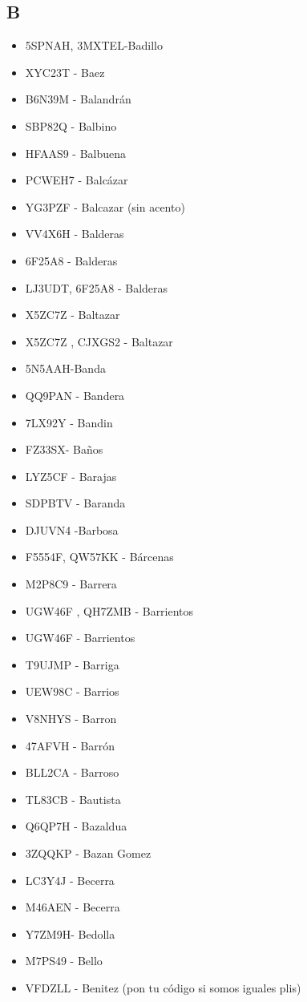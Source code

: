 \subsection*{B}
\begin{itemize}[leftmargin=*,nosep]
\item 5SPNAH, 3MXTEL-Badillo
\item XYC23T - Baez
\item B6N39M - Balandrán
\item SBP82Q  -  Balbino
\item HFAAS9  -  Balbuena
\item PCWEH7 - Balcázar
\item YG3PZF - Balcazar (sin acento)
\item VV4X6H - Balderas
\item 6F25A8  -  Balderas
\item LJ3UDT, 6F25A8 - Balderas
\item X5ZC7Z - Baltazar
\item X5ZC7Z , CJXGS2 - Baltazar
\item 5N5AAH-Banda
\item QQ9PAN - Bandera
\item 7LX92Y - Bandin
\item FZ33SX- Baños
\item LYZ5CF - Barajas
\item SDPBTV - Baranda
\item DJUVN4 -Barbosa
\item F5554F, QW57KK - Bárcenas
\item M2P8C9 -    Barrera
\item UGW46F , QH7ZMB - Barrientos
\item UGW46F - Barrientos
\item T9UJMP - Barriga
\item UEW98C - Barrios
\item V8NHYS  -  Barron
\item 47AFVH  -  Barrón
\item BLL2CA -  Barroso
\item TL83CB - Bautista
\item Q6QP7H - Bazaldua
\item 3ZQQKP  -  Bazan Gomez
\item LC3Y4J - Becerra
\item M46AEN - Becerra
\item Y7ZM9H- Bedolla
\item M7PS49 - Bello
\item VFDZLL  -  Benitez (pon tu código si somos iguales plis)

\end{itemize}
